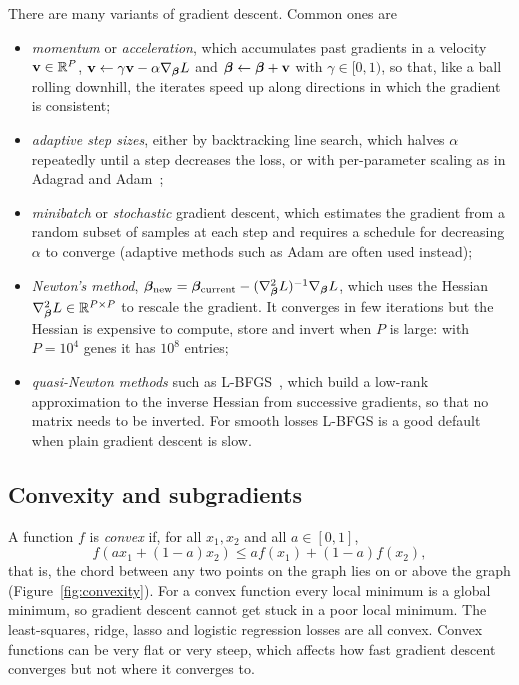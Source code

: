 There are many variants of gradient descent. Common ones are
\begin{itemize}
  \item \emph{momentum} or \emph{acceleration}, which accumulates past gradients in a velocity $\mathbf{v}\in\mathbb{R}^P$, $\mathbf{v}\leftarrow\gamma\mathbf{v}-\alpha\nabla_{\boldsymbol{\beta}}L$ and $\boldsymbol{\beta}\leftarrow\boldsymbol{\beta}+\mathbf{v}$ with $\gamma\in[0,1)$, so that, like a ball rolling downhill, the iterates speed up along directions in which the gradient is consistent;
  \item \emph{adaptive step sizes}, either by backtracking line search, which halves $\alpha$ repeatedly until a step decreases the loss, or with per-parameter scaling as in Adagrad and Adam~\citep{kingma2015};
  \item \emph{minibatch} or \emph{stochastic} gradient descent, which estimates the gradient from a random subset of samples at each step and requires a schedule for decreasing $\alpha$ to converge (adaptive methods such as Adam are often used instead);
  \item \emph{Newton's method}, $\boldsymbol{\beta}_{\text{new}}=\boldsymbol{\beta}_{\text{current}}-(\nabla^2_{\boldsymbol{\beta}}L)^{-1}\nabla_{\boldsymbol{\beta}}L$, which uses the Hessian $\nabla^2_{\boldsymbol{\beta}}L\in\mathbb{R}^{P\times P}$ to rescale the gradient. It converges in few iterations but the Hessian is expensive to compute, store and invert when $P$ is large: with $P=10^4$ genes it has $10^8$ entries;
  \item \emph{quasi-Newton methods} such as L-BFGS~\citep{liu1989}, which build a low-rank approximation to the inverse Hessian from successive gradients, so that no matrix needs to be inverted. For smooth losses L-BFGS is a good default when plain gradient descent is slow.
\end{itemize}

\subsection{Convexity and subgradients}
\label{sec:convexity}

A function $f$ is \emph{convex} if, for all $x_1, x_2$ and all $a\in[0,1]$,
\begin{equation}
  f\left(a x_1+(1-a)x_2\right) \leq a f(x_1) + (1-a) f(x_2),
\end{equation}
that is, the chord between any two points on the graph lies on or above the graph (Figure~\ref{fig:convexity}). For a convex function every local minimum is a global minimum, so gradient descent cannot get stuck in a poor local minimum. The least-squares, ridge, lasso and logistic regression losses are all convex. Convex functions can be very flat or very steep, which affects how fast gradient descent converges but not where it converges to.

